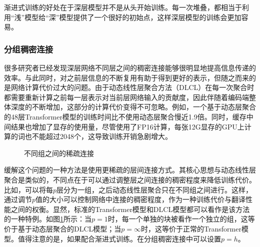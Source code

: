 \parinterval 渐进式训练的好处在于深层模型并不是从头开始训练。每一次堆叠，都相当于利用``浅''模型给``深''模型提供了一个很好的初始点，这样深层模型的训练会更加容易。


\subsubsection{分组稠密连接}

\parinterval 很多研究者已经发现深层网络不同层之间的稠密连接能够很明显地提高信息传递的效率\cite{WangLearning,DBLP:conf/cvpr/HuangLMW17,DBLP:conf/emnlp/DouTWSZ18,DBLP:conf/acl/WuWXTGQLL19}。与此同时，对之前层信息的不断复用有助于得到更好的表示，但随之而来的是网络计算代价过大的问题。由于动态线性层聚合方法（DLCL）在每一次聚合时都需要重新计算之前每一层表示对当前层网络输入的贡献度，因此伴随着编码端整体深度的不断增加，这部分的计算代价变得不可忽略。例如，一个基于动态层聚合的48层Transformer模型的训练时间比不使用动态层聚合慢近1.9倍。同时，缓存中间结果也增加了显存的使用量，尽管使用了FP16计算，每张12G显存的GPU上计算的词也不能超过2048个，这导致训练开销急剧增大。

\begin{figure}[htp]
\centering

\caption{不同组之间的稀疏连接}
\label{fig:7-31}
\end{figure}

\parinterval 缓解这个问题的一种方法是使用更稀疏的层间连接方式。其核心思想与动态线性层聚合是类似的，不同点在于可以通过调整层之间连接的稠密程度来降低训练代价。比如，可以将每$p$层分为一组，之后动态线性层聚合只在不同组之间进行。这样，通过调节$p$值的大小可以控制网络中连接的稠密程度，作为一种训练代价与翻译性能之间的权衡。显然，标准的Transformer模型\cite{NIPS2017_7181}和DLCL模型\cite{WangLearning}都可以看作是该方法的一种特例。如图\ref{fig:7-31}所示：当$p=1$时，每一个单独的块被看作一个独立的组，这等价于基于动态层聚合的DLCL模型；当$p=\infty$时，这等价于正常的Transformer模型。值得注意的是，如果配合渐进式训练。在分组稠密连接中可以设置$p=h$。


